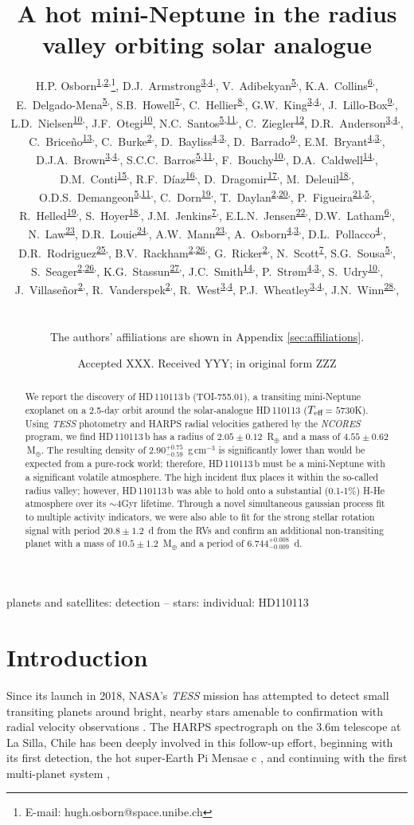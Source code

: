 \documentclass[fleqn,usenatbib]{mnras}
\title[\Tplanet{}]{A hot mini-Neptune in the radius valley orbiting solar analogue \Tstar{}}
\author[H.P. Osborn et al.]{\parbox{\textwidth}{H.P. Osborn\textsuperscript{\hyperlink{affil_1}{1},\hyperlink{affil_2}{2},\orcidicon{0000-0002-4047-4724}}\thanks{E-mail: hugh.osborn@space.unibe.ch}, 
D.J.~Armstrong\textsuperscript{\hyperlink{affil_3}{3},\hyperlink{affil_4}{4},\orcidicon{0000-0002-5080-4117}}, %
V.~Adibekyan\textsuperscript{\hyperlink{affil_5}{5},\orcidicon{0000-0002-0601-6199}}, %
K.A.~Collins\textsuperscript{\hyperlink{affil_6}{6},\orcidicon{0000-0001-6588-9574}}, %
E.~Delgado-Mena\textsuperscript{\hyperlink{affil_5}{5},\orcidicon{0000-0003-4434-2195}}, %
S.B.~Howell\textsuperscript{\hyperlink{affil_7}{7},\orcidicon{0000-0002-2532-2853}}, %
C.~Hellier\textsuperscript{\hyperlink{affil_8}{8},\orcidicon{0000-0002-3439-1439}}, %
G.W.~King\textsuperscript{\hyperlink{affil_3}{3},\hyperlink{affil_4}{4},\orcidicon{0000-0002-3641-6636}}, %
J.~Lillo-Box\textsuperscript{\hyperlink{affil_9}{9},\orcidicon{0000-0003-3742-1987}}, %
L.D.~Nielsen\textsuperscript{\hyperlink{affil_10}{10},\orcidicon{0000-0002-5254-2499}}, %
J.F.~Otegi\textsuperscript{\hyperlink{affil_10}{10}}, %
N.C.~Santos\textsuperscript{\hyperlink{affil_5}{5},\hyperlink{affil_11}{11},\orcidicon{0000-0003-4422-2919}}, %
C.~Ziegler\textsuperscript{\hyperlink{affil_12}{12}}, %
D.R.~Anderson\textsuperscript{\hyperlink{affil_3}{3},\hyperlink{affil_4}{4},\orcidicon{0000-0002-0328-1640}}, %
C.~Brice\~{n}o\textsuperscript{\hyperlink{affil_13}{13},\orcidicon{0000-0001-7124-4094}}, %
C.~Burke\textsuperscript{\hyperlink{affil_2}{2},\orcidicon{0000-0002-7754-9486}}, %
D.~Bayliss\textsuperscript{\hyperlink{affil_4}{4},\hyperlink{affil_3}{3},\orcidicon{0000-0001-6023-1335}}, %
D.~Barrado\textsuperscript{\hyperlink{affil_9}{9},\orcidicon{0000-0002-5971-9242}}, %
E.M.~Bryant\textsuperscript{\hyperlink{affil_4}{4},\hyperlink{affil_3}{3},\orcidicon{0000-0001-7904-4441}}, %
D.J.A.~Brown\textsuperscript{\hyperlink{affil_3}{3},\hyperlink{affil_4}{4},\orcidicon{0000-0003-1098-2442}}, %
S.C.C.~Barros\textsuperscript{\hyperlink{affil_5}{5},\hyperlink{affil_11}{11},\orcidicon{0000-0003-2434-3625}}, %
F.~Bouchy\textsuperscript{\hyperlink{affil_10}{10},\orcidicon{0000-0002-7613-393X}}, %
D.A.~Caldwell\textsuperscript{\hyperlink{affil_14}{14},\orcidicon{0000-0003-1963-9616}}, %
D.M.~Conti\textsuperscript{\hyperlink{affil_15}{15},\orcidicon{0000-0003-2239-0567}}, %
R.F.~Díaz\textsuperscript{\hyperlink{affil_16}{16},\orcidicon{0000-0001-9289-5160}}, %
D.~Dragomir\textsuperscript{\hyperlink{affil_17}{17},\orcidicon{0000-0003-2313-467X}}, %
M.~Deleuil\textsuperscript{\hyperlink{affil_18}{18},\orcidicon{0000-0001-6036-0225}}, %
O.D.S.~Demangeon\textsuperscript{\hyperlink{affil_5}{5},\hyperlink{affil_11}{11},\orcidicon{0000-0001-7918-0355}}, %
C.~Dorn\textsuperscript{\hyperlink{affil_19}{19},\orcidicon{0000-0001-6110-4610}}, %
T.~Daylan\textsuperscript{\hyperlink{affil_2}{2},\hyperlink{affil_20}{20},\orcidicon{0000-0002-6939-9211}}, %
P.~Figueira\textsuperscript{\hyperlink{affil_21}{21},\hyperlink{affil_5}{5},\orcidicon{0000-0001-8504-283X}}, %
R.~Helled\textsuperscript{\hyperlink{affil_19}{19},\orcidicon{0000-0001-5555-2652}}, %
S.~Hoyer\textsuperscript{\hyperlink{affil_18}{18},\orcidicon{0000-0003-3477-2466}}, %
J.M.~Jenkins\textsuperscript{\hyperlink{affil_7}{7},\orcidicon{0000-0002-4715-9460}}, %
E.L.N.~Jensen\textsuperscript{\hyperlink{affil_22}{22},\orcidicon{0000-0002-4625-7333}}, %
D.W.~Latham\textsuperscript{\hyperlink{affil_6}{6},\orcidicon{0000-0001-9911-7388}}, %
N.~Law\textsuperscript{\hyperlink{affil_23}{23}}, %
D.R.~Louie\textsuperscript{\hyperlink{affil_24}{24},\orcidicon{0000-0002-2457-272X}}, %
A.W.~Mann\textsuperscript{\hyperlink{affil_23}{23},\orcidicon{0000-0003-3654-1602}}, %
A.~Osborn\textsuperscript{\hyperlink{affil_4}{4},\hyperlink{affil_3}{3},\orcidicon{0000-0002-5899-7750}}, %
D.L.~Pollacco\textsuperscript{\hyperlink{affil_4}{4},\orcidicon{0000-0001-9850-9697}}, %
D.R.~Rodriguez\textsuperscript{\hyperlink{affil_25}{25},\orcidicon{0000-0003-1286-5231}}, %
B.V.~Rackham\textsuperscript{\hyperlink{affil_2}{2},\hyperlink{affil_26}{26},\orcidicon{0000-0002-3627-1676}}, %
G.~Ricker\textsuperscript{\hyperlink{affil_2}{2},\orcidicon{0000-0003-2058-6662}}, %
N.~Scott\textsuperscript{\hyperlink{affil_7}{7}}, %
S.G.~Sousa\textsuperscript{\hyperlink{affil_5}{5},\orcidicon{0000-0001-9047-2965}}, %
S.~Seager\textsuperscript{\hyperlink{affil_2}{2},\hyperlink{affil_26}{26},\orcidicon{0000-0002-6892-6948}}, %
K.G.~Stassun\textsuperscript{\hyperlink{affil_27}{27},\orcidicon{0000-0002-3481-9052}}, %
J.C.~Smith\textsuperscript{\hyperlink{affil_14}{14},\orcidicon{0000-0002-6148-7903}}, %
P.~Str\o{}m\textsuperscript{\hyperlink{affil_4}{4},\hyperlink{affil_3}{3},\orcidicon{0000-0002-7823-1090}}, %
S.~Udry\textsuperscript{\hyperlink{affil_10}{10},\orcidicon{0000-0001-7576-6236}}, %
J.~Villaseñor\textsuperscript{\hyperlink{affil_2}{2},\orcidicon{0000-0002-4625-8264}}, %
R.~Vanderspek\textsuperscript{\hyperlink{affil_2}{2},\orcidicon{0000-0001-6763-6562}}, %
R.~West\textsuperscript{\hyperlink{affil_3}{3},\hyperlink{affil_4}{4}}, %
P.J.~Wheatley\textsuperscript{\hyperlink{affil_3}{3},\hyperlink{affil_4}{4},\orcidicon{0000-0003-1452-2240}}, %
J.N.~Winn\textsuperscript{\hyperlink{affil_28}{28},\orcidicon{0000-0002-4265-047X}}, %
}\\
\vspace{0.4cm}
\parbox{\textwidth}{
The authors' affiliations are shown in Appendix \ref{sec:affiliations}.}
}
\date{Accepted XXX. Received YYY; in original form ZZZ}
\newcommand{\gcm}{g\,cm$^{-3}$}	%
\newcommand{\tess}{{\it TESS}}
\newcommand{\harps}{{HARPS}}
\newcommand{\rearth}{R$_{\oplus}$}
\newcommand{\mearth}{M$_{\oplus}$}
\newcommand{\teff}{$T_{\rm eff}$}
\newcommand{\TPone}{ $ 6.744^{+0.008}_{-0.009} $ }
\newcommand{\TMpzero}{ $ 4.55 \pm 0.62 $ }
\newcommand{\TMpone}{ $ 10.5 \pm 1.2 $ }
\newcommand{\Trpl}{ $ 2.05 \pm 0.12 $ }
\newcommand{\Trhopgcmthree}{ $ 2.90^{+0.75}_{-0.59} $ }
\newcommand{\Tperiod}{ $ 20.8 \pm 1.2 $ }
\newcommand{\TTplanet}{TOI-755.01}
\newcommand{\Tstar}{HD\,110113}
\newcommand{\Tplanet}{HD\,110113\,b}
\begin{document}
\label{firstpage}
\pagerange{\pageref{firstpage}--\pageref{lastpage}}
\maketitle

\begin{abstract}
We report the discovery of \Tplanet{} (\TTplanet{}), a transiting mini-Neptune exoplanet on a 2.5-day orbit around the solar-analogue \Tstar{} (\teff{}= $5730$K).
Using \tess{} photometry and \harps{} radial velocities gathered by the \textit{NCORES} program, we find \Tplanet{} has a radius of \Trpl{}\,\rearth{} and a mass of \TMpzero{}\,\mearth{}.
The resulting density of \Trhopgcmthree{}\,\gcm{} is significantly lower than would be expected from a pure-rock world; therefore, \Tplanet{} must be a mini-Neptune with a significant volatile atmosphere.
The high incident flux places it within the so-called radius valley; however, \Tplanet{} was able to hold onto a substantial (0.1-1\%) H-He atmosphere over its $\sim4$Gyr lifetime.
Through a novel simultaneous gaussian process fit to multiple activity indicators, we were also able to fit for the strong stellar rotation signal with period \Tperiod{}\,d from the RVs and confirm an additional non-transiting planet with a mass of \TMpone{}\,\mearth{} and a period of \TPone{}\,d.
\end{abstract}

\begin{keywords}
planets and satellites: detection -- stars: individual: HD110113
\end{keywords}



\section{Introduction}
Since its launch in 2018, NASA's \tess{} mission has attempted to detect small transiting planets around bright, nearby stars amenable to confirmation with radial velocity observations \citep{ricker2016transiting}.
The \harps{} spectrograph on the 3.6m telescope at La Silla, Chile \citep{2003Msngr.114...20M} has been deeply involved in this follow-up effort, beginning with its first detection, the hot super-Earth Pi Mensae c \citep{huang2018tess}, and continuing with the first multi-planet system \citep[TOI-125][]{quinn2019near,nielsen2020mass},
\end{document}
